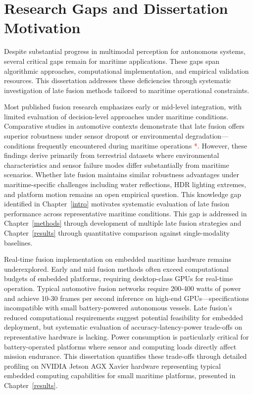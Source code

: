 \documentclass[../main.tex]{subfiles}
\begin{document}
\section{Research Gaps and Dissertation Motivation}

Despite substantial progress in multimodal perception for autonomous systems, several critical gaps remain for maritime applications. These gaps span algorithmic approaches, computational implementation, and empirical validation resources. This dissertation addresses these deficiencies through systematic investigation of late fusion methods tailored to maritime operational constraints.

Most published fusion research emphasizes early or mid-level integration, with limited evaluation of decision-level approaches under maritime conditions. Comparative studies in automotive contexts demonstrate that late fusion offers superior robustness under sensor dropout or environmental degradation—conditions frequently encountered during maritime operations \textcolor{red}{*}. However, these findings derive primarily from terrestrial datasets where environmental characteristics and sensor failure modes differ substantially from maritime scenarios. Whether late fusion maintains similar robustness advantages under maritime-specific challenges including water reflections, HDR lighting extremes, and platform motion remains an open empirical question. This knowledge gap identified in Chapter~\ref{intro} motivates systematic evaluation of late fusion performance across representative maritime conditions. This gap is addressed in Chapter~\ref{methods} through development of multiple late fusion strategies and Chapter~\ref{results} through quantitative comparison against single-modality baselines.

Real-time fusion implementation on embedded maritime hardware remains underexplored. Early and mid fusion methods often exceed computational budgets of embedded platforms, requiring desktop-class GPUs for real-time operation. Typical automotive fusion networks require 200-400 watts of power and achieve 10-30 frames per second inference on high-end GPUs—specifications incompatible with small battery-powered autonomous vessels. Late fusion's reduced computational requirements suggest potential feasibility for embedded deployment, but systematic evaluation of accuracy-latency-power trade-offs on representative hardware is lacking. Power consumption is particularly critical for battery-operated platforms where sensor and computing loads directly affect mission endurance. This dissertation quantifies these trade-offs through detailed profiling on NVIDIA Jetson AGX Xavier hardware representing typical embedded computing capabilities for small maritime platforms, presented in Chapter~\ref{results}.
\end{document}
